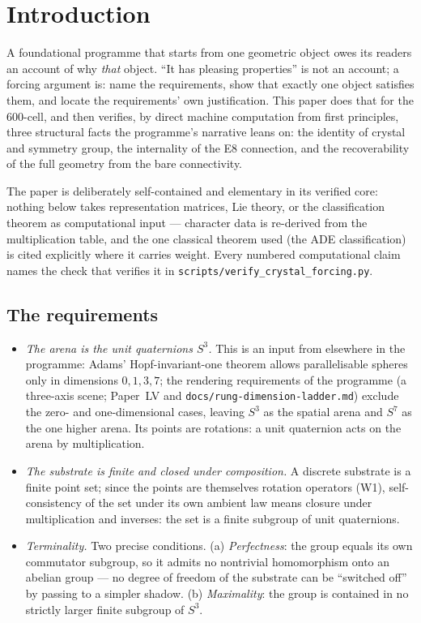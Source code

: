 \documentclass[12pt]{article}
\theoremstyle{definition}
\theoremstyle{remark}
\begin{document}
\section{Introduction}\label{sec:intro}

A foundational programme that starts from one geometric object owes its readers an account of why \emph{that} object. ``It has pleasing properties'' is not an account; a forcing argument is: name the requirements, show that exactly one object satisfies them, and locate the requirements' own justification. This paper does that for the 600-cell, and then verifies, by direct machine computation from first principles, three structural facts the programme's narrative leans on: the identity of crystal and symmetry group, the internality of the E8 connection, and the recoverability of the full geometry from the bare connectivity.

The paper is deliberately self-contained and elementary in its verified core: nothing below takes representation matrices, Lie theory, or the classification theorem as computational input --- character data is re-derived from the multiplication table, and the one classical theorem used (the ADE classification) is cited explicitly where it carries weight. Every numbered computational claim names the check that verifies it in \texttt{scripts/verify\_crystal\_forcing.py}.

\subsection{The requirements}

\begin{itemize}
\item[\textbf{(W1)}] \emph{The arena is the unit quaternions $S^3$.} This is an input from elsewhere in the programme: Adams' Hopf-invariant-one theorem allows parallelisable spheres only in dimensions $0, 1, 3, 7$; the rendering requirements of the programme (a three-axis scene; Paper~LV \citep{SmartLV} and \texttt{docs/rung-dimension-ladder.md}) exclude the zero- and one-dimensional cases, leaving $S^3$ as the spatial arena and $S^7$ as the one higher arena. Its points are rotations: a unit quaternion acts on the arena by multiplication.
\item[\textbf{(W2)}] \emph{The substrate is finite and closed under composition.} A discrete substrate is a finite point set; since the points are themselves rotation operators (W1), self-consistency of the set under its own ambient law means closure under multiplication and inverses: the set is a finite subgroup of unit quaternions.
\item[\textbf{(W3)}] \emph{Terminality.} Two precise conditions. (a) \emph{Perfectness}: the group equals its own commutator subgroup, so it admits no nontrivial homomorphism onto an abelian group --- no degree of freedom of the substrate can be ``switched off'' by passing to a simpler shadow. (b) \emph{Maximality}: the group is contained in no strictly larger finite subgroup of $S^3$.
\end{itemize}
\end{document}
